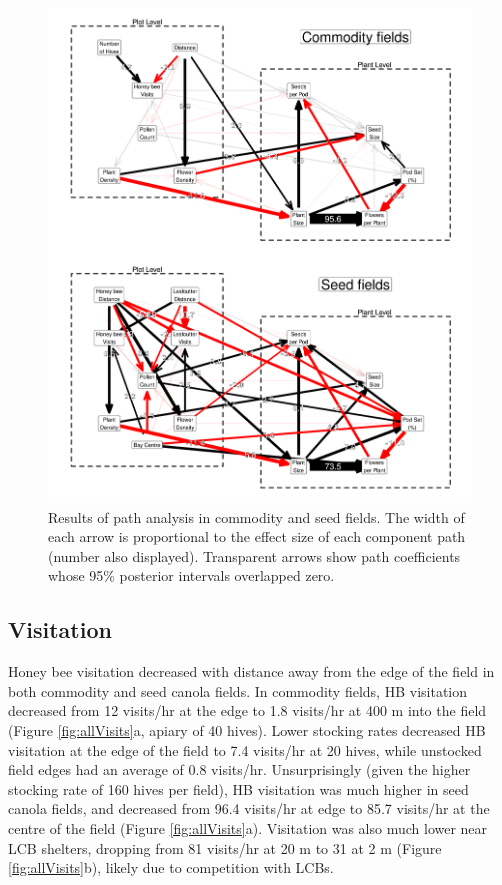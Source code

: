 \documentclass[12pt]{article} %
\begin{document}
\begin{figure}
    \centering
    \includegraphics[width=\textwidth,keepaspectratio=true]{../Figures/allSEM.png}
    \caption{Results of path analysis in commodity and seed fields. The width of each arrow is proportional to the effect size of each component path (number also displayed). Transparent arrows show path coefficients whose 95\% posterior intervals overlapped zero.}
    \label{fig:allSEM}
\end{figure}


\subsection*{Visitation}

Honey bee visitation decreased with distance away from the edge of the field in both commodity and seed canola fields.
In commodity fields, HB visitation decreased from 12 visits/hr at the edge to 1.8 visits/hr at 400 m into the field (Figure \ref{fig:allVisits}a, apiary of 40 hives).
Lower stocking rates decreased HB visitation at the edge of the field to 7.4 visits/hr at 20 hives, while unstocked field edges had an average of 0.8 visits/hr.
Unsurprisingly (given the higher stocking rate of 160 hives per field), HB visitation was much higher in seed canola fields, and decreased from 96.4 visits/hr at edge to 85.7 visits/hr at the centre of the field (Figure \ref{fig:allVisits}a). 
Visitation was also much lower near LCB shelters, dropping from 81 visits/hr at 20 m to 31 at 2 m (Figure \ref{fig:allVisits}b), likely due to competition with LCBs.
\end{document}
